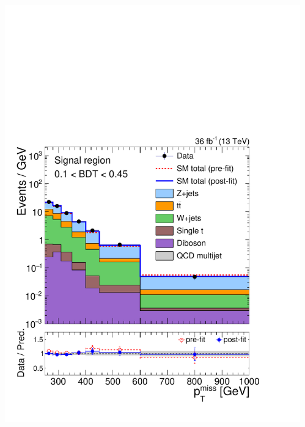 \documentclass[aspectratio=169,xcolor=dvipsnames,,table,compress]{beamer}
\begin{document}
\begin{frame}[t]
\begin{columns}[T]
\begin{column}{0.25\textwidth}
      \includegraphics[width=\textwidth]{../figures/monotop/postfit/stackedPostfit_signal_monotop_loose.pdf}
    \end{column}
    \begin{column}{0.125\textwidth}

\end{column}
\end{columns}
\end{frame}
\end{document}
